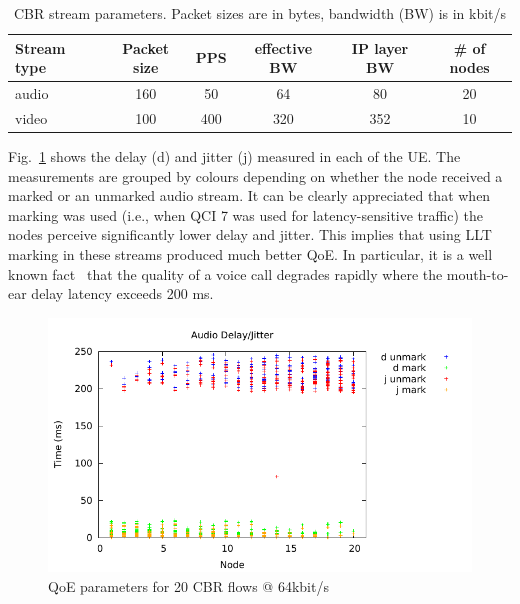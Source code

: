 \documentclass[12pt]{article}
\newcommand{\reffig}[1]{Fig.~\ref{#1}}
\begin{document}
\begin{table}[h!]
  \centering
  \begin{tabular}{lccccc}
    \toprule
	Stream type & Packet size & PPS & effective BW & IP layer BW & \# of nodes\\
    \midrule
    audio & 160 & 50  & 64 &  80 & 20\\
    video & 100 & 400 & 320 & 352 & 10\\
    \bottomrule
  \end{tabular}
  \caption{\label{tab:stream}CBR stream parameters. Packet sizes are in bytes, bandwidth (BW) is in kbit/s}
\end{table}

\reffig{fig:audio-simple} shows the delay (d) and jitter (j) measured in each
of the UE. The measurements are grouped by colours depending on whether the
node received a marked or an unmarked audio stream. It can be clearly
appreciated that when marking was used (i.e., when QCI 7 was used for
latency-sensitive traffic) the nodes perceive significantly lower delay and
jitter. This implies that using LLT marking in these streams produced much
better QoE.  In particular, it is a well known fact~\cite{ITU-G.144} that the
quality of a voice call degrades rapidly where the mouth-to-ear delay latency
exceeds 200 ms.

\begin{figure}[t]
  \centering
  \includegraphics[page=1,width=.75\textwidth]{images/simple-delay}
  \caption{\label{fig:audio-simple}QoE parameters for 20 CBR flows @ 64kbit/s%
  }
\end{figure}
\end{document}
